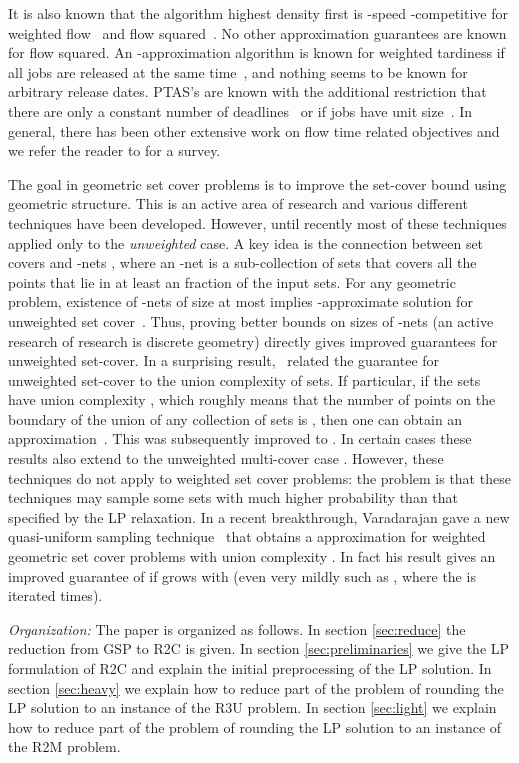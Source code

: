 \documentclass[11pt]{article}
\begin{document}
It is also known that the algorithm highest density first is 
-speed -competitive for weighted flow~\cite{BecchettiLMP06}
and flow squared~\cite{BansalP03}. No other approximation guarantees
are known for flow squared.
An -approximation algorithm is known for weighted tardiness if
all jobs are released at the same time~\cite{Cheng2005}, and nothing seems to be known for arbitrary release dates.
PTAS's are known with the additional restriction that there are only a constant
number of deadlines~\cite{KarakostasKW09} or if jobs  have unit 
size~\cite{Lawler1982}. In general, there has been other extensive work on flow time related objectives and we refer the reader to  \cite{PST} for a survey.


The goal in geometric set cover problems is to improve the  set-cover bound using 
geometric structure. This is an active area of research and various different techniques have been developed.
However, until recently most of these techniques applied only to the {\em unweighted} case. 
A key idea is the connection between set covers and  
-nets  \cite{BronnimannG95}, where an -net is a sub-collection of sets that covers all the points that lie in at least an  fraction of the input sets. 
For any geometric problem, existence of 
 -nets of size at most  implies -approximate solution for unweighted set cover~\cite{BronnimannG95}.
Thus, proving better bounds on sizes of -nets  (an active research of research
is discrete geometry) directly gives improved guarantees for unweighted set-cover.
In a surprising result,~\cite{ClarksonV07} related the guarantee for unweighted set-cover
to the union complexity of sets.
If particular, if the sets have union complexity ,
which roughly means that the number of points on the boundary of
the union of any collection of  sets is ,
then one can obtain an  approximation~\cite{ClarksonV07}. This was subsequently improved 
to  \cite{Varadarajan09}.
In certain cases these results also extend to the  unweighted multi-cover case \cite{CCS}.
However, these techniques do not apply to weighted set cover problems: the problem is that
these techniques may sample some sets with much higher 
probability than that specified by the LP relaxation. 
In a recent breakthrough,  Varadarajan gave a new quasi-uniform sampling technique~\cite{Varadarajan10}
that obtains a  approximation for weighted geometric set cover problems
with union complexity . In fact his result gives an improved guarantee of  if  grows with  (even very mildly such as , where the  is iterated   times).

{\em Organization:}
The paper is organized as follows. In
section \ref{sec:reduce} the reduction from GSP to R2C is given.
In section \ref{sec:preliminaries} we give the LP formulation
of R2C and explain the initial preprocessing of the LP solution.
In section \ref{sec:heavy}
we explain how to reduce part of the problem
of rounding the LP solution to an instance of the R3U problem.
In section \ref{sec:light}
we explain how to reduce part of the problem
of rounding the LP solution to an instance of the R2M problem.
\end{document}
